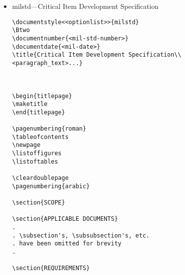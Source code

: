 \begin{itemize}
\begin{small}
\begin{verbatim}
\section{<text>} % Section 10, Appendix I

\section{<text>} % Section 20, Appendix II


\end{verbatim}
\end{small}

\item milstd---Critical Item Development Specification

\begin{small}
\begin{verbatim}
\documentstyle<<optionlist>>{milstd}
\Btwo
\documentnumber{<mil-std-number>}
\documentdate{<mil-date>}
\title{Critical Item Development Specification\\
<paragraph_text>...}



\begin{titlepage}
\maketitle
\end{titlepage}

\pagenumbering{roman}
\tableofcontents
\newpage
\listoffigures
\listoftables

\cleardoublepage
\pagenumbering{arabic}

\section{SCOPE}

\section{APPLICABLE DOCUMENTS}
.
. \subsection's, \subsubsection's, etc.
. have been omitted for brevity
.

\section{REQUIREMENTS}


\end{verbatim}
\end{small}
\end{itemize}
